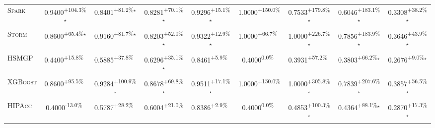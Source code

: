 \begin{table}[htbp]
\begin{tabular}{l|cccc|cccc}
\textsc{Spark} & \cellcolor{green!30}0.9400\textsuperscript{+104.3\%}$^\star$ & \cellcolor{green!30}0.8401\textsuperscript{+81.2\%}$^\star$ & \cellcolor{green!30}0.8281\textsuperscript{+70.1\%}$^\star$ & \cellcolor{green!30}0.9296\textsuperscript{+15.1\%}$^\star$ & \cellcolor{green!30}1.0000\textsuperscript{+150.0\%}$^{\,\,\,}$ & \cellcolor{green!30}0.7533\textsuperscript{+179.8\%}$^\star$ & \cellcolor{green!30}0.6046\textsuperscript{+183.1\%}$^\star$ & \cellcolor{green!30}0.3308\textsuperscript{+38.2\%}$^\star$ \\
\textsc{Storm} & \cellcolor{green!30}0.8600\textsuperscript{+65.4\%}$^\star$ & \cellcolor{green!30}0.9160\textsuperscript{+81.7\%}$^\star$ & \cellcolor{green!30}0.8203\textsuperscript{+52.0\%}$^\star$ & \cellcolor{green!30}0.9322\textsuperscript{+12.9\%}$^\star$ & \cellcolor{green!30}1.0000\textsuperscript{+66.7\%}$^{\,\,\,}$ & \cellcolor{green!30}1.0000\textsuperscript{+226.7\%}$^\star$ & \cellcolor{green!30}0.7856\textsuperscript{+183.9\%}$^\star$ & \cellcolor{green!30}0.3646\textsuperscript{+43.9\%}$^\star$ \\
\textsc{HSMGP} & \cellcolor{green!30}0.4400\textsuperscript{+15.8\%}$^{\,\,\,}$ & \cellcolor{green!30}0.5885\textsuperscript{+37.8\%}$^{\,\,\,}$ & \cellcolor{green!30}0.6296\textsuperscript{+35.1\%}$^\star$ & \cellcolor{green!30}0.8461\textsuperscript{+5.9\%}$^{\,\,\,}$ & \cellcolor{red!30}0.4000\textsuperscript{0.0\%}$^{\,\,\,}$ & \cellcolor{green!30}0.3931\textsuperscript{+57.2\%}$^{\,\,\,}$ & \cellcolor{green!30}0.3803\textsuperscript{+66.2\%}$^\star$ & \cellcolor{green!30}0.2676\textsuperscript{+9.0\%}$^\star$ \\
\textsc{XGBoost} & \cellcolor{green!30}0.8600\textsuperscript{+95.5\%}$^{\,\,\,}$ & \cellcolor{green!30}0.9284\textsuperscript{+100.9\%}$^\star$ & \cellcolor{green!30}0.8678\textsuperscript{+69.8\%}$^\star$ & \cellcolor{green!30}0.9511\textsuperscript{+17.1\%}$^\star$ & \cellcolor{green!30}1.0000\textsuperscript{+150.0\%}$^{\,\,\,}$ & \cellcolor{green!30}1.0000\textsuperscript{+305.8\%}$^\star$ & \cellcolor{green!30}0.7839\textsuperscript{+207.6\%}$^\star$ & \cellcolor{green!30}0.3857\textsuperscript{+56.5\%}$^\star$ \\
\textsc{HIPAcc} & \cellcolor{red!30}0.4000\textsuperscript{-13.0\%}$^{\,\,\,}$ & \cellcolor{green!30}0.5787\textsuperscript{+28.2\%}$^{\,\,\,}$ & \cellcolor{green!30}0.6004\textsuperscript{+21.0\%}$^{\,\,\,}$ & \cellcolor{green!30}0.8386\textsuperscript{+2.9\%}$^{\,\,\,}$ & \cellcolor{red!30}0.4000\textsuperscript{0.0\%}$^{\,\,\,}$ & \cellcolor{green!30}0.4853\textsuperscript{+100.3\%}$^\star$ & \cellcolor{green!30}0.4364\textsuperscript{+88.1\%}$^\star$ & \cellcolor{green!30}0.2870\textsuperscript{+17.3\%}$^\star$ \\

\end{tabular}
\end{table}
